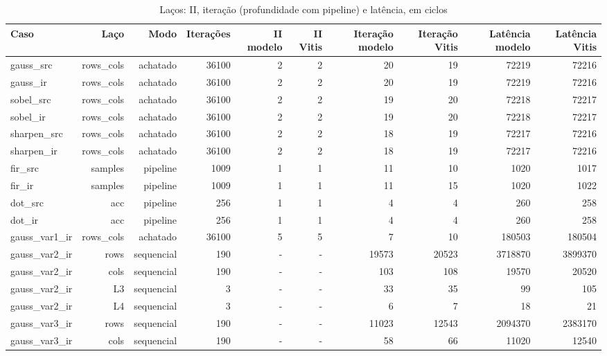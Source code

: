 \begin{table}[htbp]
\centering
\caption{Laços: II, iteração (profundidade com pipeline) e latência, em ciclos}
\begin{tabular}{|l|r|r|r|r|r|r|r|r|r|}
\hline
\rowcolor{tabAzul}\color{white}Caso & \color{white}Laço & \color{white}Modo & \color{white}Iterações & \color{white}II modelo & \color{white}II Vitis & \color{white}Iteração modelo & \color{white}Iteração Vitis & \color{white}Latência modelo & \color{white}Latência Vitis \\
\hline
gauss\_src & rows\_cols & achatado & 36100 & 2 & 2 & 20 & 19 & 72219 & 72216 \\ \hline
gauss\_ir & rows\_cols & achatado & 36100 & 2 & 2 & 20 & 19 & 72219 & 72216 \\ \hline
sobel\_src & rows\_cols & achatado & 36100 & 2 & 2 & 19 & 20 & 72218 & 72217 \\ \hline
sobel\_ir & rows\_cols & achatado & 36100 & 2 & 2 & 19 & 20 & 72218 & 72217 \\ \hline
sharpen\_src & rows\_cols & achatado & 36100 & 2 & 2 & 18 & 19 & 72217 & 72216 \\ \hline
sharpen\_ir & rows\_cols & achatado & 36100 & 2 & 2 & 18 & 19 & 72217 & 72216 \\ \hline
fir\_src & samples & pipeline & 1009 & 1 & 1 & 11 & 10 & 1020 & 1017 \\ \hline
fir\_ir & samples & pipeline & 1009 & 1 & 1 & 11 & 15 & 1020 & 1022 \\ \hline
dot\_src & acc & pipeline & 256 & 1 & 1 & 4 & 4 & 260 & 258 \\ \hline
dot\_ir & acc & pipeline & 256 & 1 & 1 & 4 & 4 & 260 & 258 \\ \hline
gauss\_var1\_ir & rows\_cols & achatado & 36100 & 5 & 5 & 7 & 10 & 180503 & 180504 \\ \hline
gauss\_var2\_ir & rows & sequencial & 190 & - & - & 19573 & 20523 & 3718870 & 3899370 \\ \hline
gauss\_var2\_ir & cols & sequencial & 190 & - & - & 103 & 108 & 19570 & 20520 \\ \hline
gauss\_var2\_ir & L3 & sequencial & 3 & - & - & 33 & 35 & 99 & 105 \\ \hline
gauss\_var2\_ir & L4 & sequencial & 3 & - & - & 6 & 7 & 18 & 21 \\ \hline
gauss\_var3\_ir & rows & sequencial & 190 & - & - & 11023 & 12543 & 2094370 & 2383170 \\ \hline
gauss\_var3\_ir & cols & sequencial & 190 & - & - & 58 & 66 & 11020 & 12540 \\ \hline

\end{tabular}
\end{table}
